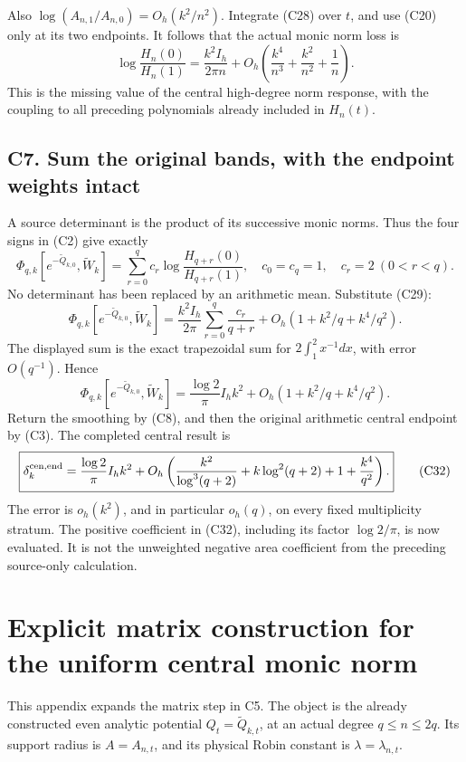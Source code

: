 \documentclass[11pt,a4paper]{article}
\begin{document}
Also \(\log(A_{n,1}/A_{n,0})=O_h(k^2/n^2)\). Integrate (C28) over \(t\),
and use (C20) only at its two endpoints. It follows that the actual
monic norm loss is \[
\boxed{\log\frac{H_n(0)}{H_n(1)}
=\frac{k^2I_h}{2\pi n}
+O_h\left(\frac{k^4}{n^3}+\frac{k^2}{n^2}+\frac1n\right).}\tag{C29}
\] This is the missing value of the central high-degree norm response,
with the coupling to all preceding polynomials already included in
\(H_n(t)\).

\subsection{C7. Sum the original bands, with the endpoint weights
intact}\label{sa:c7.-sum-the-original-bands-with-the-endpoint-weights-intact}

A source determinant is the product of its successive monic norms. Thus
the four signs in (C2) give exactly \[
\Phi_{q,k}[e^{-\widetilde Q_{k,0}},\widetilde W_k]
=\sum_{r=0}^q c_r\log\frac{H_{q+r}(0)}{H_{q+r}(1)},
\quad c_0=c_q=1,\quad c_r=2\ (0<r<q).
\tag{C30}
\] No determinant has been replaced by an arithmetic mean. Substitute
(C29): \[
\Phi_{q,k}[e^{-\widetilde Q_{k,0}},\widetilde W_k]
=\frac{k^2I_h}{2\pi}\sum_{r=0}^q\frac{c_r}{q+r}
+O_h(1+k^2/q+k^4/q^2).
\] The displayed sum is the exact trapezoidal sum for
\(2\int_1^2x^{-1}dx\), with error \(O(q^{-1})\). Hence \[
\Phi_{q,k}[e^{-\widetilde Q_{k,0}},\widetilde W_k]
=\frac{\log2}{\pi}I_h k^2+O_h(1+k^2/q+k^4/q^2).
\tag{C31}
\] Return the smoothing by (C8), and then the original arithmetic
central endpoint by (C3). The completed central result is \[
\boxed{\delta_k^{\rm cen,end}
=\frac{\log2}{\pi}I_h k^2+
O_h\left(\frac{k^2}{\log^3(q+2)}+k\log^2(q+2)+1+\frac{k^4}{q^2}\right).}\tag{C32}
\] The error is \(o_h(k^2)\), and in particular \(o_h(q)\), on every
fixed multiplicity stratum. The positive coefficient in (C32), including
its factor \(\log2/\pi\), is now evaluated. It is not the unweighted
negative area coefficient from the preceding source-only calculation.

\newpage

\section{Explicit matrix construction for the uniform central monic
norm}\label{sa:explicit-matrix-construction-for-the-uniform-central-monic-norm}

This appendix expands the matrix step in C5. The object is the already
constructed even analytic potential \(Q_t=\widetilde Q_{k,t}\), at an
actual degree \(q\le n\le2q\). Its support radius is \(A=A_{n,t}\), and
its physical Robin constant is \(\lambda=\lambda_{n,t}\).
\end{document}

